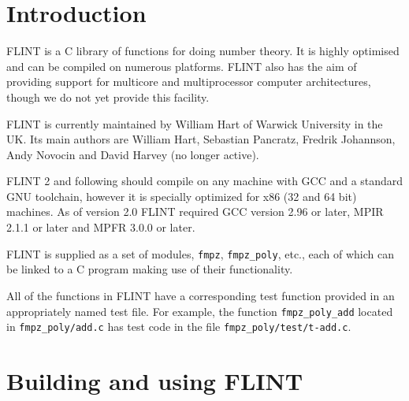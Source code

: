 \documentclass[a4paper,10pt]{book}
\newcommand{\code}{\lstinline}
\begin{document}

\frontmatter


\clearpage

\tableofcontents


\mainmatter

\chapter{Introduction}

FLINT is a C library of functions for doing number theory. It is highly 
optimised and can be compiled on numerous platforms.  FLINT also has the 
aim of providing support for multicore and multiprocessor computer 
architectures, though we do not yet provide this facility.

FLINT is currently maintained by William Hart of Warwick University in 
the UK. Its main authors are William Hart, Sebastian Pancratz, Fredrik
Johannson, Andy Novocin and David Harvey (no longer active).

FLINT 2 and following should compile on any machine with GCC and a standard 
GNU toolchain, however it is specially optimized for x86 (32 and 64 bit)
machines. As of version 2.0 FLINT required GCC version 2.96 or later, 
MPIR 2.1.1 or later and MPFR 3.0.0 or later.

FLINT is supplied as a set of modules, \code{fmpz}, \code{fmpz_poly}, etc., 
each of which can be linked to a C program making use of their functionality.

All of the functions in FLINT have a corresponding test function provided 
in an appropriately named test file.  For example, the function 
\code{fmpz_poly_add} located in \code{fmpz_poly/add.c} has test code in the 
file \code{fmpz_poly/test/t-add.c}.

\chapter{Building and using FLINT}
\end{document}

